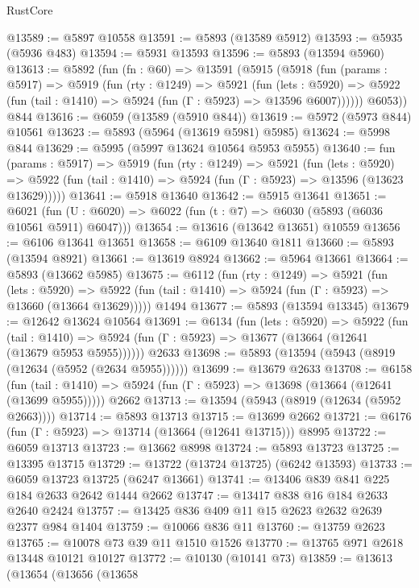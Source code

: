 \begin{lexlean}{RustCore}
\begin{coremodule}
@13589 := @5897 @10558
@13591 := @5893 (@13589 @5912)
@13593 := @5935 (@5936 @483)
@13594 := @5931 @13593
@13596 := @5893 (@13594 @5960)
@13613 := @5892
    (fun (fn : @60) =>
    @13591
      (@5915
        (@5918
          (fun (params : @5917) =>
          @5919
            (fun (rty : @1249) =>
            @5921
              (fun (lets : @5920) =>
              @5922 (fun (tail : @1410) => @5924 (fun (Γ : @5923) => @13596 @6007))))))
        @6053))
    @844
@13616 := @6059 (@13589 (@5910 @844))
@13619 := @5972 (@5973 @844) @10561
@13623 := @5893 (@5964 (@13619 @5981) @5985)
@13624 := @5998 @844
@13629 := @5995 (@5997 @13624 @10564 @5953 @5955)
@13640 := fun (params : @5917) =>
  @5919
    (fun (rty : @1249) =>
    @5921
      (fun (lets : @5920) =>
      @5922 (fun (tail : @1410) => @5924 (fun (Γ : @5923) => @13596 (@13623 @13629)))))
@13641 := @5918 @13640
@13642 := @5915 @13641
@13651 := @6021
    (fun (U : @6020) => @6022 (fun (t : @7) => @6030 (@5893 (@6036 @10561 @5911) @6047)))
@13654 := @13616 (@13642 @13651) @10559
@13656 := @6106 @13641 @13651
@13658 := @6109 @13640 @1811
@13660 := @5893 (@13594 @8921)
@13661 := @13619 @8924
@13662 := @5964 @13661
@13664 := @5893 (@13662 @5985)
@13675 := @6112
    (fun (rty : @1249) =>
    @5921
      (fun (lets : @5920) =>
      @5922 (fun (tail : @1410) => @5924 (fun (Γ : @5923) => @13660 (@13664 @13629)))))
    @1494
@13677 := @5893 (@13594 @13345)
@13679 := @12642 @13624 @10564
@13691 := @6134
    (fun (lets : @5920) =>
    @5922
      (fun (tail : @1410) =>
      @5924 (fun (Γ : @5923) => @13677 (@13664 (@12641 (@13679 @5953 @5955))))))
    @2633
@13698 := @5893 (@13594 (@5943 (@8919 (@12634 (@5952 (@2634 @5955))))))
@13699 := @13679 @2633
@13708 := @6158
    (fun (tail : @1410) => @5924 (fun (Γ : @5923) => @13698 (@13664 (@12641 (@13699 @5955)))))
    @2662
@13713 := @13594 (@5943 (@8919 (@12634 (@5952 @2663))))
@13714 := @5893 @13713
@13715 := @13699 @2662
@13721 := @6176 (fun (Γ : @5923) => @13714 (@13664 (@12641 @13715))) @8995
@13722 := @6059 @13713
@13723 := @13662 @8998
@13724 := @5893 @13723
@13725 := @13395 @13715
@13729 := @13722 (@13724 @13725) (@6242 @13593)
@13733 := @6059 @13723 @13725 (@6247 @13661)
@13741 := @13406 @839 @841 @225 @184 @2633 @2642 @1444 @2662
@13747 := @13417 @838 @16 @184 @2633 @2640 @2424
@13757 := @13425 @836 @409 @11 @15 @2623 @2632 @2639 @2377 @984 @1404
@13759 := @10066 @836 @11
@13760 := @13759 @2623
@13765 := @10078 @73 @39 @11 @1510 @1526
@13770 := @13765 @971 @2618 @13448 @10121 @10127
@13772 := @10130 (@10141 @73)
@13859 := @13613
    (@13654
      (@13656
        (@13658

\end{coremodule}
\end{lexlean}
